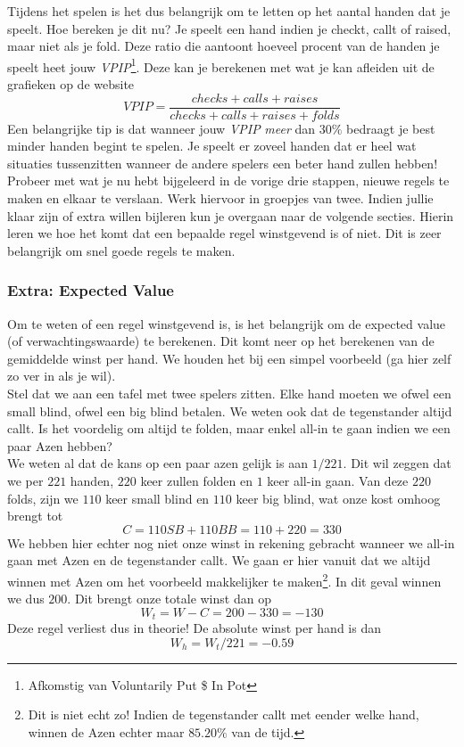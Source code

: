 \documentclass{article}
\begin{document}
        Tijdens het spelen is het dus belangrijk om te letten op het aantal handen dat je speelt. Hoe bereken je dit nu? Je speelt een hand indien je checkt, callt of raised, maar niet als je fold. Deze ratio die aantoont hoeveel procent van de handen je speelt heet jouw \emph{VPIP}\footnote{Afkomstig van Voluntarily Put \$ In Pot}. Deze kan je berekenen met wat je kan afleiden uit de grafieken op de website
        $$VPIP = \frac{checks + calls + raises}{checks + calls + raises + folds}$$
        Een belangrijke tip is dat wanneer jouw \emph{VPIP} \emph{meer} dan $30\%$ bedraagt je best minder handen begint te spelen. Je speelt er zoveel handen dat er heel wat situaties tussenzitten wanneer de andere spelers een beter hand zullen hebben!\\

        Probeer met wat je nu hebt bijgeleerd in de vorige drie stappen, nieuwe regels te maken en elkaar te verslaan. Werk hiervoor in groepjes van twee. Indien jullie klaar zijn of extra willen bijleren kun je overgaan naar de volgende secties. Hierin leren we hoe het komt dat een bepaalde regel winstgevend is of niet. Dit is zeer belangrijk om snel goede regels te maken.

    \subsubsection{Extra: Expected Value}

        Om te weten of een regel winstgevend is, is het belangrijk om de expected value (of verwachtingswaarde) te berekenen. Dit komt neer op het berekenen van de gemiddelde winst per hand. We houden het bij een simpel voorbeeld (ga hier zelf zo ver in als je wil).\\

        Stel dat we aan een tafel met twee spelers zitten. Elke hand moeten we ofwel een small blind, ofwel een big blind betalen. We weten ook dat de tegenstander altijd callt. Is het voordelig om altijd te folden, maar enkel all-in te gaan indien we een paar Azen hebben?\\

        We weten al dat de kans op een paar azen gelijk is aan $1/221$. Dit wil zeggen dat we per $221$ handen, $220$ keer zullen folden en $1$ keer all-in gaan. Van deze $220$ folds, zijn we $110$ keer small blind en $110$ keer big blind, wat onze kost omhoog brengt tot
        $$C = 110SB + 110BB = 110+220 = 330$$
        We hebben hier echter nog niet onze winst in rekening gebracht wanneer we all-in gaan met Azen en de tegenstander callt. We gaan er hier vanuit dat we altijd winnen met Azen om het voorbeeld makkelijker te maken\footnote{Dit is niet echt zo! Indien de tegenstander callt met eender welke hand, winnen de Azen echter maar $85.20\%$ van de tijd.}. In dit geval winnen we dus $200$. Dit brengt onze totale winst dan op
        $$W_t = W - C = 200-330 = -130$$
        Deze regel verliest dus in theorie! De absolute winst per hand is dan
        $$W_h = W_t / 221 = -0.59$$
\end{document}
